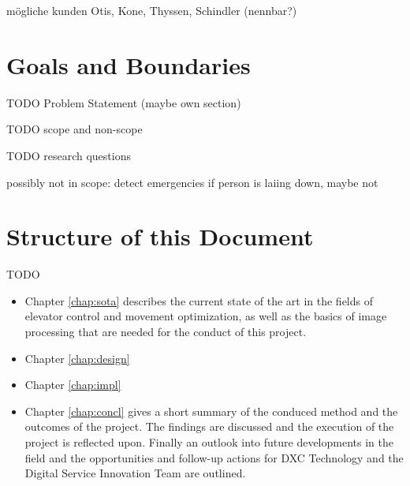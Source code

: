 mögliche kunden Otis, Kone, Thyssen, Schindler (nennbar?)

\section{Goals and Boundaries}

TODO Problem Statement (maybe own section)

TODO scope and non-scope

TODO research questions

possibly not in scope: detect emergencies if person is laiing down, maybe not


\section{Structure of this Document}

TODO

\begin{itemize}
    \item Chapter \ref{chap:sota} describes the current state of the art in the fields of elevator control and movement optimization, as well as the basics of image processing that are needed for the conduct of this project.
    \item Chapter \ref{chap:design} 
    \item Chapter \ref{chap:impl}
    \item Chapter \ref{chap:concl} gives a short summary of the conduced method and the outcomes of the project. The findings are discussed and the execution of the project is reflected upon. Finally an outlook into future developments in the field and the opportunities and follow-up actions for DXC Technology and the Digital Service Innovation Team are outlined.
\end{itemize}